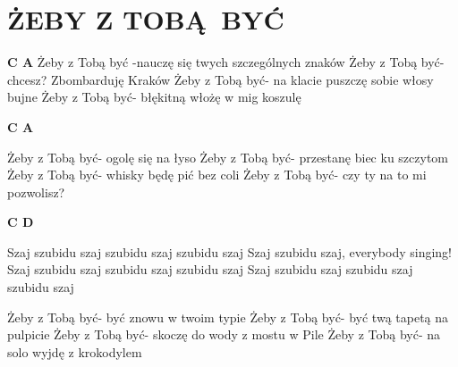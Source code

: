 \documentclass[../../../songbook.tex]{subfiles}
\begin{document}
\TabPositions{9cm} %
\section*{ŻEBY Z TOBĄ BYĆ}
{}
\vspace{0.5cm}
{\color{red}\textbf{C A} } \newline
Żeby z Tobą być -nauczę się twych szczególnych znaków	 \newline
Żeby z Tobą być- chcesz? Zbombarduję Kraków				 \newline
Żeby z Tobą być- na klacie puszczę sobie włosy bujne		 \newline
Żeby z Tobą być- błękitną włożę w mig koszulę		 \newline

{\color{red}\textbf{C A} } \newline

Żeby z Tobą być- ogolę się na łyso			\newline
Żeby z Tobą być- przestanę biec ku szczytom			\newline
Żeby z Tobą być- whisky będę pić bez coli			\newline
Żeby z Tobą być- czy ty na to mi pozwolisz?			\newline

{\color{red}\textbf{C D} } \newline

\-\hspace{1cm} Szaj szubidu szaj szubidu szaj szubidu szaj		 \newline
\-\hspace{1cm} Szaj szubidu szaj, everybody singing!			 \newline
\-\hspace{1cm} Szaj szubidu szaj szubidu szaj szubidu szaj		 \newline
\-\hspace{1cm} Szaj szubidu szaj szubidu szaj szubidu szaj		 \newline

Żeby z Tobą być- być znowu w twoim typie			\newline
Żeby z Tobą być- być twą tapetą na pulpicie			\newline
Żeby z Tobą być- skoczę do wody z mostu w Pile			\newline
Żeby z Tobą być- na solo wyjdę z krokodylem			\newline
\end{document}
